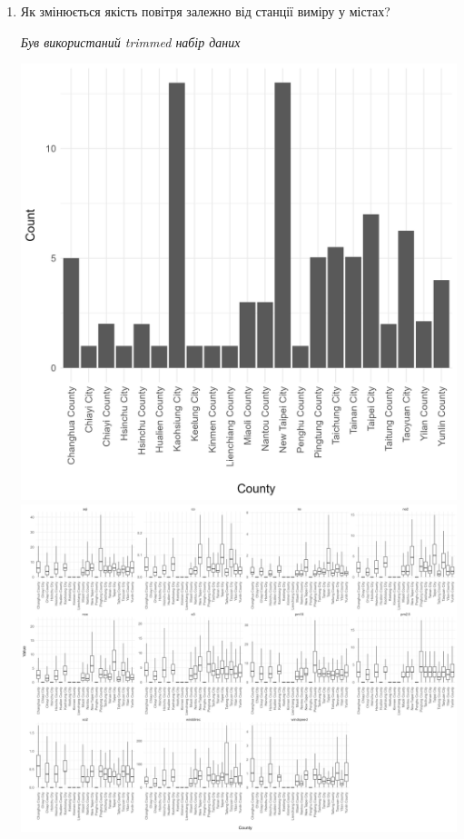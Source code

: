 \documentclass[./report.tex]{subfiles}
\begin{document}
\begin{enumerate}
  \item Як змінюється якість повітря залежно від станції виміру у містах?
    
  \quad \textit{Був використаний trimmed набір даних}

  \includegraphics[width=6in]{plots/question7/bar-count.png}
  \includegraphics[width=6in]{plots/question7/box-county.png}

\end{enumerate}
\end{document}
